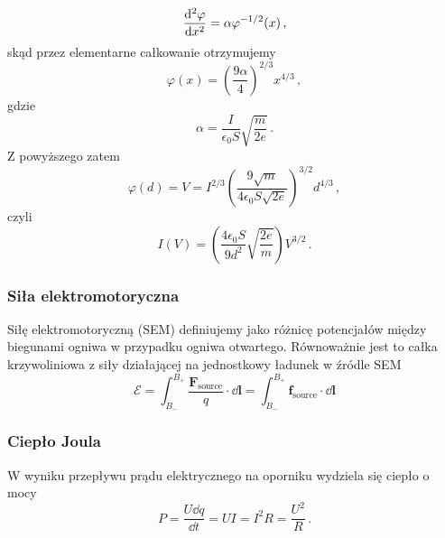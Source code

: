 \documentclass[../main.tex]{subfiles}
\begin{document}
\begin{equation*}
    \dv[2]{\varphi}{x}=\alpha\varphi^{-1/2}(x)\,,
\end{equation*}
skąd przez elementarne całkowanie otrzymujemy
\begin{equation*}
    \varphi(x)=\left(\frac{9\alpha}{4}\right)^{2/3}x^{4/3}\,,
\end{equation*}
gdzie
\begin{equation*}
    \alpha=\frac{I}{\epsilon_0S}\sqrt{\frac{m}{2e}}\,.
\end{equation*}
Z powyższego zatem
\begin{equation*}
    \varphi(d)=V=I^{2/3}\left(\frac{9\sqrt{m}}{4\epsilon_0S\sqrt{2e}}\right)^{3/2}d^{4/3}\,,
\end{equation*}
czyli
\begin{equation*}
    I(V)=\left(\frac{4\epsilon_0S}{9d^2}\sqrt{\frac{2e}{m}}\right)V^{3/2}\,.
\end{equation*}
    \subsubsection{Siła elektromotoryczna}
    Siłę elektromotoryczną (SEM) definiujemy jako różnicę potencjałów między biegunami ogniwa w
    przypadku ogniwa otwartego. Równoważnie jest to całka krzywoliniowa z siły działającej na
    jednostkowy ładunek w źródle SEM
    \begin{equation*}
        \mathcal{E}=\int_{B_-}^{B_+}\frac{\mathbf{F}_\text{source}}{q}\cdot\dd{\mathbf{l}}=\int_{B_-}^{B_+}\mathbf{f}_\text{source}\cdot\dd{\mathbf{l}}
    \end{equation*}
    
    \subsubsection{Ciepło Joula}
    W wyniku przepływu prądu elektrycznego na oporniku wydziela się ciepło o mocy
    \begin{equation*}
        P=\frac{U\dd{q}}{\dd{t}}=UI=I^2R=\frac{U^2}{R}\,.
    \end{equation*}
    
\end{document}
